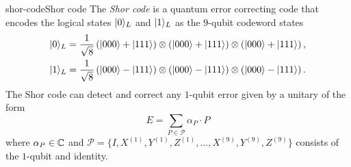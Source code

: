\begin{topic}{shor-code}{Shor code}
    The \emph{Shor code} is a quantum error correcting code that encodes the logical  states $|0\rangle_L$ and $|1\rangle_L$ as the $9$-qubit codeword states
    \[ \begin{aligned}
        |0\rangle_L &= \frac{1}{\sqrt{8}} \left( |000\rangle + |111\rangle \right) \otimes \left( |000\rangle + |111\rangle \right) \otimes \left( |000\rangle + |111\rangle \right) , \\
        |1\rangle_L &= \frac{1}{\sqrt{8}} \left( |000\rangle - |111\rangle \right) \otimes \left( |000\rangle - |111\rangle \right) \otimes \left( |000\rangle - |111\rangle \right) .
    \end{aligned} \]
    The Shor code can detect and correct any $1$-qubit error given by a unitary of the form
    \[ E = \sum_{P \in \mathcal{P}} \alpha_P \cdot P \]
    where $\alpha_P \in \mathbb{C}$ and $\mathcal{P} = \{ I, X^{(1)}, Y^{(1)}, Z^{(1)}, \ldots, X^{(9)}, Y^{(9)}, Z^{(9)} \}$ consists of the $1$-qubit  and identity.
    

\end{topic}
